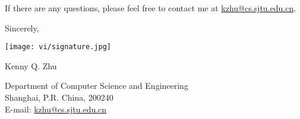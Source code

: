 \documentclass[11pt]{article}
\begin{document}

If there are any questions, please feel free to contact me at \href{mailto:kzhu@cs.sjtu.edu.cn}{kzhu@cs.sjtu.edu.cn}.

\vspace{0.5cm}
Sincerely, \par \medskip

\texttt{[image: vi/signature.jpg]} \par
Kenny Q. Zhu \par

\vspace{0.5cm}
\begin{flushright}
Department of Computer Science and Engineering \\
Shanghai, P.R. China, 200240 \\
E-mail: \href{mailto:kzhu@cs.sjtu.edu.cn}{kzhu@cs.sjtu.edu.cn}
\end{flushright}
\end{document}

